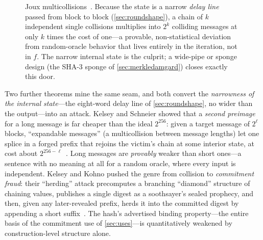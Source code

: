 \begin{figure}[ht]
  \centering
  \caption{Joux multicollisions~\citep{Joux2004}. Because the state is
  a narrow \emph{delay line} passed from block to block
  (\cref{sec:roundshape}), a chain of $k$ independent single collisions
  multiplies into $2^k$ colliding messages at only $k$ times the cost
  of one---a provable, non-statistical deviation from random-oracle
  behavior that lives entirely in the iteration, not in $f$. The
  narrow internal state is the culprit; a wide-pipe or sponge design
  (the SHA-3 sponge of \cref{sec:merkledamgard}) closes exactly this
  door.}
  \label{fig:multicoll}
\end{figure}

Two further theorems mine the same seam, and both convert the
\emph{narrowness of the internal state}---the eight-word delay line of
\cref{sec:roundshape}, no wider than the output---into an attack.
Kelsey and Schneier showed that a \emph{second preimage} for a long
message is far cheaper than the ideal $2^{256}$: given a target message
of $2^\ell$ blocks, ``expandable messages'' (a multicollision between
message lengths) let one splice in a forged prefix that rejoins the
victim's chain at some interior state, at cost about
$2^{256-\ell}$~\citep{KelseySchneier2005}. Long messages are
\emph{provably} weaker than short ones---a sentence with no meaning at
all for a random oracle, where every input is independent.
Kelsey and Kohno pushed the genre from collision to \emph{commitment
fraud}: their ``herding'' attack precomputes a branching ``diamond''
structure of chaining values, publishes a single digest as a
soothsayer's sealed prophecy, and then, given any later-revealed
prefix, herds it into the committed digest by appending a short
suffix~\citep{KelseyKohno2006}. The hash's advertised binding
property---the entire basis of the commitment use of
\cref{sec:uses}---is quantitatively weakened by construction-level
structure alone.

